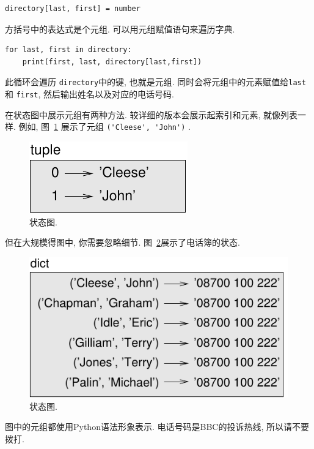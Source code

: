 \documentclass[10pt]{book}
\begin{document}
\begin{verbatim}
directory[last, first] = number
\end{verbatim}
%
方括号中的表达式是个元组. 
可以用元组赋值语句来遍历字典.

\begin{verbatim}
for last, first in directory:
    print(first, last, directory[last,first])
\end{verbatim}
%
此循环会遍历 {\tt directory}中的键, 也就是元组. 
同时会将元组中的元素赋值给{\tt last} 和 {\tt first}, 
然后输出姓名以及对应的电话号码. 

在状态图中展示元组有两种方法. 
较详细的版本会展示起索引和元素, 就像列表一样. 
例如, 图~\ref{fig.tuple1} 展示了元组 \verb"('Cleese', 'John')" .

\begin{figure}
\centerline
{\includegraphics[scale=0.8]{figs/tuple1.pdf}}
\caption{状态图.}
\label{fig.tuple1}
\end{figure}

但在大规模得图中, 你需要忽略细节. 
图~\ref{fig.dict2}展示了电话簿的状态.

\begin{figure}
\centerline
{\includegraphics[scale=0.8]{figs/dict2.pdf}}
\caption{状态图.}
\label{fig.dict2}
\end{figure}

图中的元组都使用Python语法形象表示. 
电话号码是BBC的投诉热线, 所以请不要拨打. 
\end{document}
